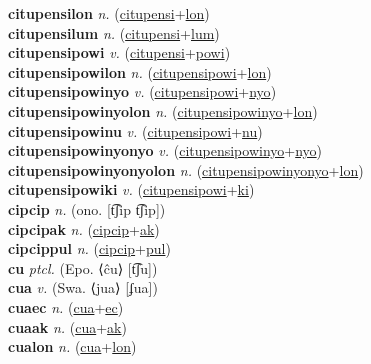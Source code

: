 \textbf{citupensilon} \textit{n.} (\hyperref[citupensi]{citupensi}+\hyperref[lon]{lon})
 \label{citupensilon} \\
\textbf{citupensilum} \textit{n.} (\hyperref[citupensi]{citupensi}+\hyperref[lum]{lum})
 \label{citupensilum} \\
\textbf{citupensipowi} \textit{v.} (\hyperref[citupensi]{citupensi}+\hyperref[powi]{powi})
 \label{citupensipowi} \\
\textbf{citupensipowilon} \textit{n.} (\hyperref[citupensipowi]{citupensipowi}+\hyperref[lon]{lon})
 \label{citupensipowilon} \\
\textbf{citupensipowinyo} \textit{v.} (\hyperref[citupensipowi]{citupensipowi}+\hyperref[nyo]{nyo})
 \label{citupensipowinyo} \\
\textbf{citupensipowinyolon} \textit{n.} (\hyperref[citupensipowinyo]{citupensipowinyo}+\hyperref[lon]{lon})
 \label{citupensipowinyolon} \\
\textbf{citupensipowinu} \textit{v.} (\hyperref[citupensipowi]{citupensipowi}+\hyperref[nu]{nu})
 \label{citupensipowinu} \\
\textbf{citupensipowinyonyo} \textit{v.} (\hyperref[citupensipowinyo]{citupensipowinyo}+\hyperref[nyo]{nyo})
 \label{citupensipowinyonyo} \\
\textbf{citupensipowinyonyolon} \textit{n.} (\hyperref[citupensipowinyonyo]{citupensipowinyonyo}+\hyperref[lon]{lon})
 \label{citupensipowinyonyolon} \\
\textbf{citupensipowiki} \textit{v.} (\hyperref[citupensipowi]{citupensipowi}+\hyperref[ki]{ki})
 \label{citupensipowiki} \\
\textbf{cipcip} \textit{n.} (ono. [t͡ʃip t͡ʃip])
 \label{cipcip} \\
\textbf{cipcipak} \textit{n.} (\hyperref[cipcip]{cipcip}+\hyperref[ak]{ak})
 \label{cipcipak} \\
\textbf{cipcippul} \textit{n.} (\hyperref[cipcip]{cipcip}+\hyperref[pul]{pul})
 \label{cipcippul} \\
\textbf{cu} \textit{ptcl.} (Epo. ⟨ĉu⟩ [t͡ʃu])
 \label{cu} \\
\textbf{cua} \textit{v.} (Swa. ⟨jua⟩ [ʄua])
 \label{cua} \\
\textbf{cuaec} \textit{n.} (\hyperref[cua]{cua}+\hyperref[ec]{ec})
 \label{cuaec} \\
\textbf{cuaak} \textit{n.} (\hyperref[cua]{cua}+\hyperref[ak]{ak})
 \label{cuaak} \\
\textbf{cualon} \textit{n.} (\hyperref[cua]{cua}+\hyperref[lon]{lon})
 \label{cualon} \\
